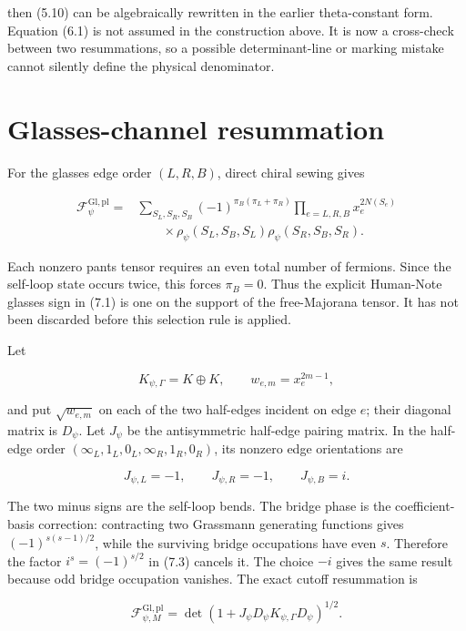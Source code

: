 \documentclass[11pt]{article}
\begin{document}
then (5.10) can be algebraically rewritten in the earlier theta-constant
form.  Equation (6.1) is not assumed in the construction above.  It is now a
cross-check between two resummations, so a possible determinant-line or
marking mistake cannot silently define the physical denominator.

\section{Glasses-channel resummation}

For the glasses edge order \((L,R,B)\), direct chiral sewing gives

\[
\begin{aligned}
\mathcal F_\psi^{\mathrm{Gl},\mathrm{pl}}
={}&\sum_{S_L,S_R,S_B}
 (-1)^{\pi_B(\pi_L+\pi_R)}
 \prod_{e=L,R,B}x_e^{2N(S_e)}\\
&\qquad\times
 \rho_\psi(S_L,S_B,S_L)
 \rho_\psi(S_R,S_B,S_R).
\end{aligned}
\tag{7.1}
\]

Each nonzero pants tensor requires an even total number of fermions.  Since
the self-loop state occurs twice, this forces \(\pi_B=0\).  Thus the explicit
Human-Note glasses sign in (7.1) is one on the support of the free-Majorana
tensor.  It has not been discarded before this selection rule is applied.

Let

\[
 K_{\psi,\Gamma}=K\oplus K,
 \qquad
 w_{e,m}=x_e^{2m-1},
\tag{7.2}
\]

and put \(\sqrt{w_{e,m}}\) on each of the two half-edges incident on edge
\(e\); their diagonal matrix is \(D_\psi\).  Let \(J_\psi\) be the
antisymmetric half-edge pairing matrix.  In the half-edge order
\((\infty_L,1_L,0_L,\infty_R,1_R,0_R)\), its nonzero edge orientations are

\[
 J_{\psi,L}=-1,
 \qquad J_{\psi,R}=-1,
 \qquad J_{\psi,B}=i.
\tag{7.3}
\]

The two minus signs are the self-loop bends.  The bridge phase is the
coefficient-basis correction: contracting two Grassmann generating functions
gives \((-1)^{s(s-1)/2}\), while the surviving bridge occupations have even
\(s\).  Therefore the factor \(i^s=(-1)^{s/2}\) in (7.3) cancels it.  The
choice \(-i\) gives the same result because odd bridge occupation vanishes.
The exact cutoff resummation is

\[
\boxed{
 \mathcal F_{\psi,M}^{\mathrm{Gl},\mathrm{pl}}
 =\det\!\left(
  1+J_\psi D_\psi K_{\psi,\Gamma}D_\psi
 \right)^{1/2}.}
\tag{7.4}
\]
\end{document}

